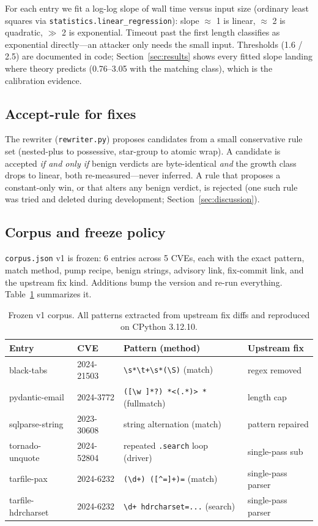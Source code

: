 \documentclass[11pt,a4paper]{article}
\begin{document}
For each entry we fit a log-log slope of wall time versus input size (ordinary least squares via \verb!statistics.linear_regression!): slope $\approx$ 1 is linear, $\approx$ 2 is quadratic, $\gg$ 2 is exponential. Timeout past the first length classifies as exponential directly---an attacker only needs the small input. Thresholds (1.6 / 2.5) are documented in code; Section~\ref{sec:results} shows every fitted slope landing where theory predicts (0.76--3.05 with the matching class), which is the calibration evidence.

\subsection{Accept-rule for fixes}

The rewriter (\verb!rewriter.py!) proposes candidates from a small conservative rule set (nested-plus to possessive, star-group to atomic wrap). A candidate is accepted \textit{if and only if} benign verdicts are byte-identical \textit{and} the growth class drops to linear, both re-measured---never inferred. A rule that proposes a constant-only win, or that alters any benign verdict, is rejected (one such rule was tried and deleted during development; Section~\ref{sec:discussion}).

\subsection{Corpus and freeze policy}

\verb!corpus.json! v1 is frozen: 6 entries across 5 CVEs, each with the exact pattern, match method, pump recipe, benign strings, advisory link, fix-commit link, and the upstream fix kind. Additions bump the version and re-run everything. Table~\ref{tab:corpus} summarizes it.

\begin{table}[H]
\centering
\caption{Frozen v1 corpus. All patterns extracted from upstream fix diffs and reproduced on CPython 3.12.10.}
\label{tab:corpus}
\begin{tabular}{@{}llll@{}}
\toprule
Entry & CVE & Pattern (method) & Upstream fix \\
\midrule
black-tabs & 2024-21503 & \verb!\s*\t+\s*(\S)! (match) & regex removed \\
pydantic-email & 2024-3772 & \verb!([\w ]*?) *<(.*)> *! (fullmatch) & length cap \\
sqlparse-string & 2023-30608 & string alternation (match) & pattern repaired \\
tornado-unquote & 2024-52804 & repeated \verb!.search! loop (driver) & single-pass sub \\
tarfile-pax & 2024-6232 & \verb!(\d+) ([^=]+)=! (match) & single-pass parser \\
tarfile-hdrcharset & 2024-6232 & \verb!\d+ hdrcharset=...! (search) & single-pass parser \\
\bottomrule
\end{tabular}
\end{table}
\end{document}
